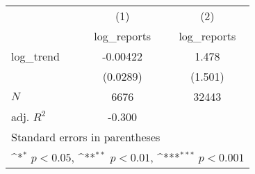 {
\def\sym#1{\ifmmode^{#1}\else\(^{#1}\)\fi}
\begin{tabular}{l*{2}{c}}
\hline\hline
            &\multicolumn{1}{c}{(1)}&\multicolumn{1}{c}{(2)}\\
            &\multicolumn{1}{c}{log\_reports}&\multicolumn{1}{c}{log\_reports}\\
\hline
log\_trend   &    -0.00422         &       1.478         \\
            &    (0.0289)         &     (1.501)         \\
\hline
\(N\)       &        6676         &       32443         \\
adj. \(R^{2}\)&      -0.300         &                     \\
\hline\hline
\multicolumn{3}{l}{\footnotesize Standard errors in parentheses}\\
\multicolumn{3}{l}{\footnotesize \sym{*} \(p<0.05\), \sym{**} \(p<0.01\), \sym{***} \(p<0.001\)}\\
\end{tabular}
}
